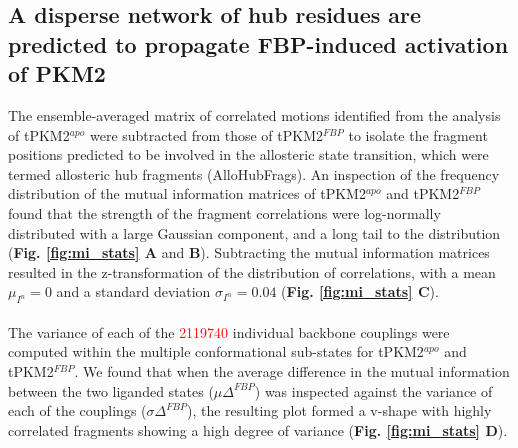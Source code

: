 \subsection{A disperse network of hub residues are predicted to propagate FBP-induced activation of PKM2}
\label{subsec:allohubfrag_ident}
The ensemble-averaged matrix of correlated motions identified from the analysis of tPKM2$^{apo}$ were subtracted from those of tPKM2$^{FBP}$ to isolate the fragment positions predicted to be involved in the allosteric state transition, which were termed allosteric hub fragments (AlloHubFrags). An inspection of the frequency distribution of the mutual information matrices of tPKM2$^{apo}$ and tPKM2$^{FBP}$ found that the strength of the fragment correlations were log-normally distributed with a large Gaussian component, and a long tail to the distribution (\textbf{Fig. \ref{fig:mi_stats} A} and \textbf{B}). Subtracting the mutual information matrices resulted in the z-transformation of the distribution of correlations, with a mean $\mu_{I^{n}} = 0$ and a standard deviation $\sigma _{I^{n}} = 0.04$ (\textbf{Fig. \ref{fig:mi_stats} C}). 
%
%
\\\\
%
%
The variance of each of the \textcolor{red}{2119740} individual backbone couplings were computed within the multiple conformational sub-states for tPKM2$^{apo}$ and tPKM2$^{FBP}$. We found that when the average difference in the mutual information between the two liganded states ($\mu \Delta^{FBP}$) was inspected against the variance of each of the couplings ($\sigma \Delta^{FBP}$), the resulting plot formed a v-shape with highly correlated fragments showing a high degree of variance (\textbf{Fig. \ref{fig:mi_stats} D}). 
%
%
%
%
%
